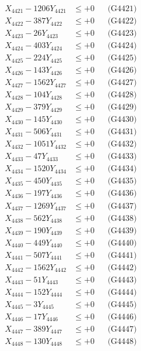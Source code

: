\documentclass[a4paper,10pt]{article}
\begin{document}
{\begin{align}
\allowbreak
X_{4421} - 1206Y_{4421} &\leq +0 && \text{(G4421)} \\
X_{4422} - 387Y_{4422} &\leq +0 && \text{(G4422)} \\
X_{4423} - 26Y_{4423} &\leq +0 && \text{(G4423)} \\
X_{4424} - 403Y_{4424} &\leq +0 && \text{(G4424)} \\
X_{4425} - 224Y_{4425} &\leq +0 && \text{(G4425)} \\
X_{4426} - 143Y_{4426} &\leq +0 && \text{(G4426)} \\
X_{4427} - 1562Y_{4427} &\leq +0 && \text{(G4427)} \\
X_{4428} - 104Y_{4428} &\leq +0 && \text{(G4428)} \\
X_{4429} - 379Y_{4429} &\leq +0 && \text{(G4429)} \\
X_{4430} - 145Y_{4430} &\leq +0 && \text{(G4430)} \\
\allowbreak
X_{4431} - 506Y_{4431} &\leq +0 && \text{(G4431)} \\
X_{4432} - 1051Y_{4432} &\leq +0 && \text{(G4432)} \\
X_{4433} - 47Y_{4433} &\leq +0 && \text{(G4433)} \\
X_{4434} - 1520Y_{4434} &\leq +0 && \text{(G4434)} \\
X_{4435} - 450Y_{4435} &\leq +0 && \text{(G4435)} \\
X_{4436} - 197Y_{4436} &\leq +0 && \text{(G4436)} \\
X_{4437} - 1269Y_{4437} &\leq +0 && \text{(G4437)} \\
X_{4438} - 562Y_{4438} &\leq +0 && \text{(G4438)} \\
X_{4439} - 190Y_{4439} &\leq +0 && \text{(G4439)} \\
X_{4440} - 449Y_{4440} &\leq +0 && \text{(G4440)} \\
\allowbreak
X_{4441} - 507Y_{4441} &\leq +0 && \text{(G4441)} \\
X_{4442} - 1562Y_{4442} &\leq +0 && \text{(G4442)} \\
X_{4443} - 51Y_{4443} &\leq +0 && \text{(G4443)} \\
X_{4444} - 152Y_{4444} &\leq +0 && \text{(G4444)} \\
X_{4445} - 3Y_{4445} &\leq +0 && \text{(G4445)} \\
X_{4446} - 17Y_{4446} &\leq +0 && \text{(G4446)} \\
X_{4447} - 389Y_{4447} &\leq +0 && \text{(G4447)} \\
X_{4448} - 130Y_{4448} &\leq +0 && \text{(G4448)} \\

\end{align}}
\end{document}
